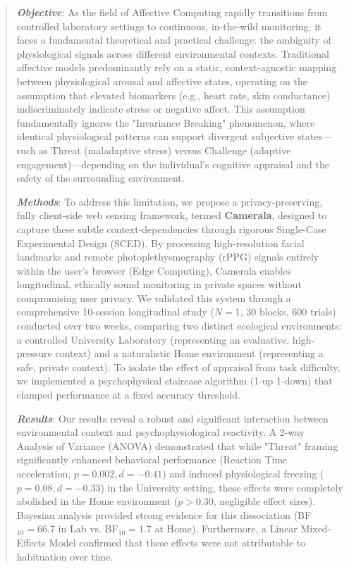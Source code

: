\documentclass[journal]{IEEEtran}
\begin{document}
\begin{abstract}
\textbf{\textit{Objective}}: As the field of Affective Computing rapidly transitions from controlled laboratory settings 
to continuous, in-the-wild monitoring, it faces a fundamental theoretical and practical challenge: 
the ambiguity of physiological signals across different environmental contexts. 
Traditional affective models predominantly rely on a static, context-agnostic mapping between physiological arousal and affective states, 
operating on the assumption that elevated biomarkers (e.g., heart rate, skin conductance) indiscriminately indicate stress or negative affect. 
This assumption fundamentally ignores the "Invariance Breaking" phenomenon, where identical physiological patterns can support 
divergent subjective states—such as Threat (maladaptive stress) versus Challenge (adaptive engagement)—depending on the 
individual's cognitive appraisal and the safety of the surrounding environment.

\textbf{\textit{Methods}}: To address this limitation, we propose a privacy-preserving, fully client-side web sensing framework, 
termed \textbf{Camerala}, designed to capture these subtle context-dependencies through rigorous Single-Case Experimental Design (SCED). 
By processing high-resolution facial landmarks and remote photoplethysmography (rPPG) signals entirely within the user's browser (Edge Computing), 
Camerala enables longitudinal, ethically sound monitoring in private spaces without compromising user privacy. 
We validated this system through a comprehensive 10-session longitudinal study ($N=1$, 30 blocks, 600 trials) conducted over two weeks, 
comparing two distinct ecological environments: a controlled University Laboratory (representing an evaluative, high-pressure context) 
and a naturalistic Home environment (representing a safe, private context). 
To isolate the effect of appraisal from task difficulty, we implemented a psychophysical staircase algorithm (1-up 1-down) 
that clamped performance at a fixed accuracy threshold.

\textbf{\textit{Results}}: Our results reveal a robust and significant interaction between environmental context and psychophysiological reactivity. 
A 2-way Analysis of Variance (ANOVA) demonstrated that while "Threat" framing significantly enhanced behavioral performance 
(Reaction Time acceleration, $p=0.002, d=-0.41$) and induced physiological freezing ($p=0.08, d=-0.33$) in the University setting, 
these effects were completely abolished in the Home environment ($p>0.30$, negligible effect sizes). 
Bayesian analysis provided strong evidence for this dissociation (BF$_{10}=66.7$ in Lab vs. BF$_{10}=1.7$ at Home). 
Furthermore, a Linear Mixed-Effects Model confirmed that these effects were not attributable to habituation over time.


\end{abstract}
\end{document}
